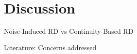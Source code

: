 \section{Discussion}
    
    \frame{\sectionpage}

    \begin{frame}{Noise-Induced RD vs Continuity-Based RD}

    \end{frame}
    
    \begin{frame}{Literature: Concerns addressed}
        
    \end{frame}

    